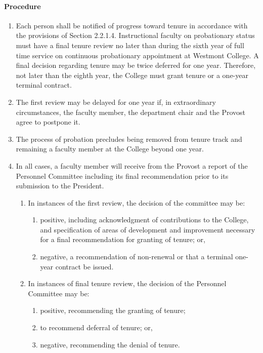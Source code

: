 \documentclass[letterpaper, 11pt]{article}
\begin{document}
			\paragraph{Procedure}
				\begin{enumerate}[label=\alph*)]
					\item{Each person shall be notified of progress toward tenure in accordance with the provisions of Section 2.2.1.4.  Instructional faculty on probationary status must have a final tenure review no later than during the sixth year of full time service on continuous probationary appointment at Westmont College.  A final decision regarding tenure may be twice deferred for one year.  Therefore, not later than the eighth year, the College must grant tenure or a one-year terminal contract.}
					\item{The first review may be delayed for one year if, in extraordinary circumstances, the faculty member, the department chair and the Provost agree to postpone it.}
					\item{The process of probation precludes being removed from tenure track and remaining a faculty member at the College beyond one year.}
					\item{In all cases, a faculty member will receive from the Provost a report of the Personnel Committee including its final recommendation prior to its submission to the President.
						\begin{enumerate}[label=\arabic*)]
							\item{In instances of the first review, the decision of the committee may be:
								\begin{enumerate}[label=()\alph*)]
									\item{positive, including acknowledgment of contributions to the College, and specification of areas of development and improvement necessary for a final recommendation for granting of tenure; or,}
									\item{negative, a recommendation of non-renewal or that a terminal one-year contract be issued.}
								\end{enumerate}
							}
							\item{In instances of final tenure review, the decision of the Personnel Committee may be:
								\begin{enumerate}[label=()\alph*)]
									\item{positive, recommending the granting of tenure;}
									\item{to recommend deferral of tenure; or,}
									\item{negative, recommending the denial of tenure.}

\end{enumerate}}
\end{enumerate}}
\end{enumerate}
\end{document}
